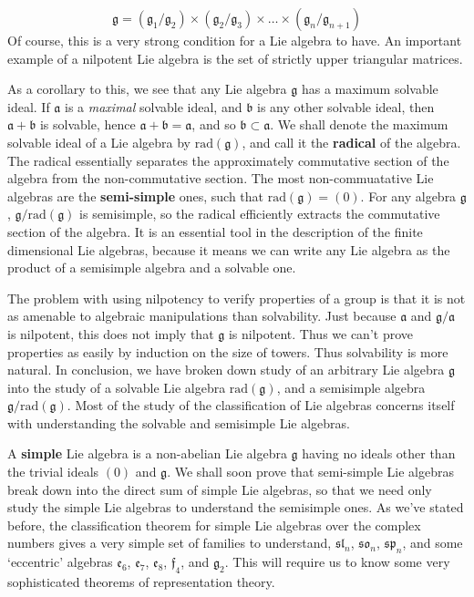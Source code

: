 %
\[ \mathfrak{g} = (\mathfrak{g}_1/\mathfrak{g}_2) \times (\mathfrak{g}_2/\mathfrak{g}_3) \times \dots \times (\mathfrak{g}_n/\mathfrak{g}_{n+1}) \]
%
Of course, this is a very strong condition for a Lie algebra to have. An important example of a nilpotent Lie algebra is the set of strictly upper triangular matrices.

As a corollary to this, we see that any Lie algebra $\mathfrak{g}$ has a maximum solvable ideal. If $\mathfrak{a}$ is a {\it maximal} solvable ideal, and $\mathfrak{b}$ is any other solvable ideal, then $\mathfrak{a} + \mathfrak{b}$ is solvable, hence $\mathfrak{a} + \mathfrak{b} = \mathfrak{a}$, and so $\mathfrak{b} \subset \mathfrak{a}$. We shall denote the maximum solvable ideal of a Lie algebra by $\text{rad}(\mathfrak{g})$, and call it the {\bf radical} of the algebra. The radical essentially separates the approximately commutative section of the algebra from the non-commutative section. The most non-commuatative Lie algebras are the {\bf semi-simple} ones, such that $\text{rad}(\mathfrak{g}) = (0)$. For any algebra $\mathfrak{g}$, $\mathfrak{g}/\text{rad}(\mathfrak{g})$ is semisimple, so the radical efficiently extracts the commutative section of the algebra. It is an essential tool in the description of the finite dimensional Lie algebras, because it means we can write any Lie algebra as the product of a semisimple algebra and a solvable one.

The problem with using nilpotency to verify properties of a group is that it is not as amenable to algebraic manipulations than solvability. Just because $\mathfrak{a}$ and $\mathfrak{g}/\mathfrak{a}$ is nilpotent, this does not imply that $\mathfrak{g}$ is nilpotent. Thus we can't prove properties as easily by induction on the size of towers. Thus solvability is more natural. In conclusion, we have broken down study of an arbitrary Lie algebra $\mathfrak{g}$ into the study of a solvable Lie algebra $\text{rad}(\mathfrak{g})$, and a semisimple algebra $\mathfrak{g}/\text{rad}(\mathfrak{g})$. Most of the study of the classification of Lie algebras concerns itself with understanding the solvable and semisimple Lie algebras.

A {\bf simple} Lie algebra is a non-abelian Lie algebra $\mathfrak{g}$ having no ideals other than the trivial ideals $(0)$ and $\mathfrak{g}$. We shall soon prove that semi-simple Lie algebras break down into the direct sum of simple Lie algebras, so that we need only study the simple Lie algebras to understand the semisimple ones. As we've stated before, the classification theorem for simple Lie algebras over the complex numbers gives a very simple set of families to understand, $\mathfrak{sl}_n$, $\mathfrak{so}_n$, $\mathfrak{sp}_n$, and some `eccentric' algebras $\mathfrak{e}_6$, $\mathfrak{e}_7$, $\mathfrak{e}_8$, $\mathfrak{f}_4$, and $\mathfrak{g}_2$. This will require us to know some very sophisticated theorems of representation theory.






